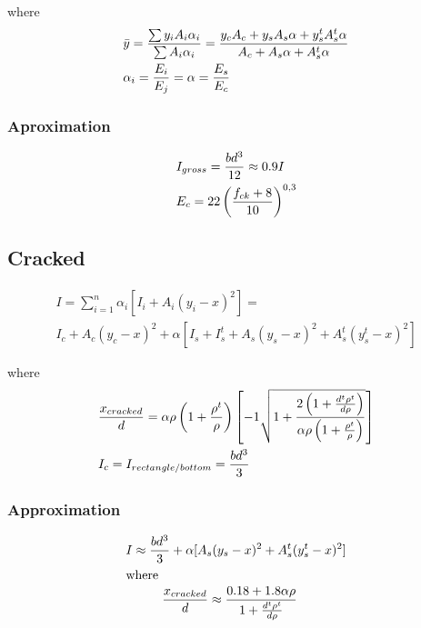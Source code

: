 \documentclass[landscape]{article}
\begin{document}
\begin{multicols*}{2}
  where
    $$
      \begin{aligned}
        &\bar{y}= \frac{\sum y_i A_i \alpha_i  }{\sum  A_i \alpha_i} = \frac{y_c A_c + y_s A_s \alpha + y_s^t A_s^t \alpha  }{ A_c +  A_s \alpha +  A_s^t \alpha} \\
        & \alpha_i = \frac{E_i}{E_j} = \alpha = \frac{E_s}{E_c}
      \end{aligned}\notag
    $$


    \subsubsection{Aproximation} %
    \label{ssub:aproximation}
    $$
      \begin{aligned}
        &I_{gross}= \frac{bd^3}{12} \approx 0.9 I \\
        & E_c = 22\left(\frac{f_{ck}+8}{10}\right)^{0,3}
      \end{aligned}\notag
    $$


    \subsection{Cracked} %
    \label{sub:cracked}

    \begin{multline}
      I = \sum_{i=1}^n \alpha_i[I_i + A_i (y_i-x)^2]=\\ I_c + A_c (y_c-x)^2 + \alpha[I_s + I_s^t + A_s (y_s-x)^2 + A_s^t (y_s^t-x)^2]  
    \end{multline}

  where
    $$
      \begin{aligned}
        &\frac{x_{cracked}}{d}= \alpha \rho \left(1 + \frac{\rho^t}{\rho} \right) \left[ - 1 \sqrt{1+ \frac{2\left(1 + \frac{d^t\rho^t}{d\rho}\right)}{\alpha \rho \left(1 + \frac{\rho^t}{\rho}\right) } }\right] \\
        & I_c= I_{rectangle/bottom} = \frac{bd^3}{3}
      \end{aligned}\notag
    $$

    \subsubsection{Approximation} %
    \label{ssub:approximation}

    \begin{gather}\label{eq:2.1}
      I \approx \frac{bd^3}{3}+ \alpha[ A_s (y_s-x)^2 + A_s^t (y_s^t-x)^2] \\
      \shortintertext{where}
      \begin{aligned}
        &\frac{x_{cracked}}{d} \approx \frac{0.18 + 1.8\alpha \rho }{1 + \frac{d^t \rho^t }{d \rho}}
      \end{aligned}\notag
    \end{gather}


\end{multicols*}
\end{document}
